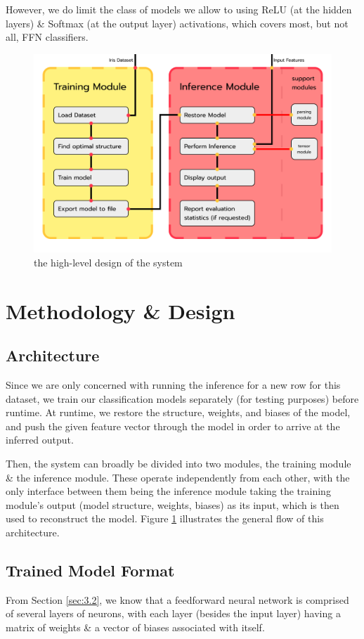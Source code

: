 \documentclass[12pt, titlepage]{article}
\begin{document}
However, we do limit the class of models we allow to using ReLU (at the hidden layers) \& Softmax (at the output layer) activations, which covers most, but not all, FFN classifiers.

\begin{figure}
	\includegraphics[width=0.85\pdfpagewidth]{../images/modules.png}
	\caption{\label{fig:2}the high-level design of the system}
\end{figure}

\section{Methodology \& Design}
\subsection{Architecture}
Since we are only concerned with running the inference for a new row for this dataset, we train our classification models separately (for testing purposes) before runtime. At runtime, we restore the structure, weights, and biases of the model, and push the given feature vector through the model in order to arrive at the inferred output.\bigskip

Then, the system can broadly be divided into two modules, the training module \& the inference module. These operate independently from each other, with the only interface between them being the inference module taking the training module's output (model structure, weights, biases) as its input, which is then used to reconstruct the model. Figure \ref{fig:2} illustrates the general flow of this architecture.

\subsection{Trained Model Format}
From Section \ref{sec:3.2}, we know that a feedforward neural network is comprised of several layers of neurons, with each layer (besides the input layer) having a matrix of weights \& a vector of biases associated with itself.\bigskip
\end{document}
